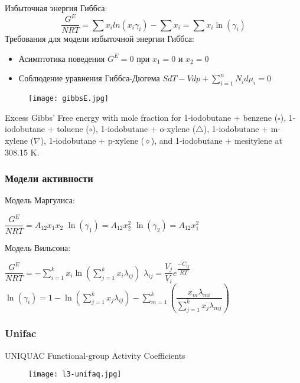 \begin{frame}
	Избыточная энергия Гиббса:
\begin{equation}
\dfrac {G^E}{NRT} = { \sum x_i ln(x_i \gamma_i) - \sum x_i }  = \sum x_i \ln( \gamma_i )
\end{equation}
Требования для модели избыточной энергии Гиббса:
\begin{itemize}
\item Асимптотика поведения $G^E=0$ при $x_1=0$ и $x_2=0$
\item Соблюдение уравнения Гиббса-Дюгема $S dT - V dp + \sum_{ i=1}^n N_i d \mu_i =0$


\end{itemize}
\end{frame}

\begin{frame}
	\begin{figure}[h]
		\texttt{[image: gibbsE.jpg]}
	\end{figure}
	
	Excess Gibbs’ Free energy  with mole fraction for 1-iodobutane + benzene ($\square$), 1-iodobutane + toluene ($\circ$), 1-iodobutane + o-xylene ($\triangle$), 1-iodobutane + m-xylene ($\nabla$), 1-iodobutane + p-xylene ($\diamond$), and 1-iodobutane + mesitylene  at 308.15 K.
\end{frame}

\begin{frame}
	\frametitle{Модели активности}
	Модель Маргулиса:
	
	$\dfrac{G^E}{NRT} = A_{12} x_1 x_2$
	$\ln( \gamma_1 )=A_{12} x_2^2$
	$\ln( \gamma_2 )=A_{12} x_1^2$
	
	Модель Вильсона:
	
	$\dfrac{G^E} {NRT} = -\sum_{i=1}^k x_i \ln( \sum_{j=1}^k x_i \lambda_{ij} ) $
	$\lambda_{ij} = \dfrac {V_j}{V_i} e^{ \dfrac{-C_{ij}} {RT} }$
	$\ln( \gamma_i )=1-\ln \left( \sum_{j=1}^k x_j \lambda_{ij} \right) - \sum_{m=1}^k \left(  \dfrac{x_m \lambda_{mi}}{\sum_{j=1}^k x_j \lambda_{mj} } \right)$
	
\end{frame}

\begin{frame}
	\frametitle{Unifac}
	UNIQUAC Functional-group Activity Coefficients
	
	\begin{figure}[h]
		\texttt{[image: l3-unifaq.jpg]}
	\end{figure}
\end{frame}

